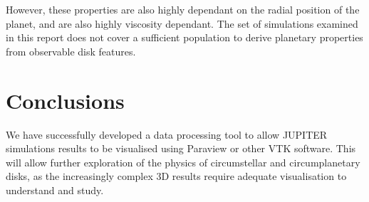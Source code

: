 \documentclass[preprint2]{aastex62}
\begin{document}
However, these properties are also highly dependant on the radial position of the planet, and are also highly viscosity dependant. The set of simulations examined in this report does not cover a sufficient population to derive planetary properties from observable disk features.




\section{Conclusions}\label{sec:con}
We have successfully developed a data processing tool to allow JUPITER simulations results to be visualised using Paraview or other VTK software. This will allow further exploration of the physics of circumstellar and circumplanetary disks, as the increasingly complex 3D results require adequate visualisation to understand and study. 
\end{document}
